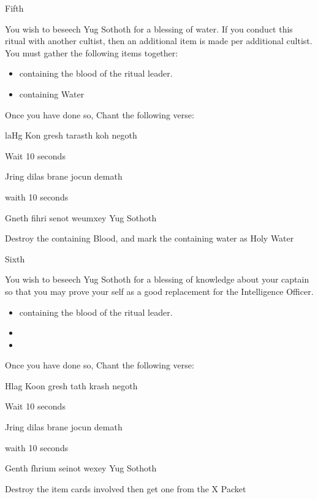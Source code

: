 \documentclass[greennotebook]{guildcamp4} %
\begin{document}
\begin{page}{Fifth}
	
		You wish to beseech Yug Sothoth for a blessing of water. If you conduct this ritual with another cultist, then an additional item is made per additional cultist. You must gather the following items together: 
		
		\begin{itemize}
			\item \iTestTube{} containing the blood of the ritual leader.
			\item \iTestTube{} containing Water
		\end{itemize}
		
		Once you have done so, Chant the following verse:
		
		laHg Kon gresh tarasth koh negoth
		
		Wait 10 seconds
		
		Jring dilas brane jocun demath
		
		waith 10 seconds
		
		Gneth fihri senot weumxey Yug Sothoth
		
		Destroy the \iTestTube{} containing Blood, and mark the \iTestTube{} containing water as Holy Water
		
	
\end{page}

\begin{page}{Sixth}
	

	You wish to beseech Yug Sothoth for a blessing of knowledge about your captain so that you may prove your self as a good replacement for the Intelligence Officer.  
		
	\begin{itemize}
			\item \iTestTube{} containing the blood of the ritual leader.
			\item \iGlassLens{}
			\item \iScrapMetal{}
	\end{itemize}
	
	Once you have done so, Chant the following verse:
		
	Hlag Koon gresh tath krash negoth
	
	Wait 10 seconds
	
	Jring dilas brane jocun demath
	
	waith 10 seconds
	
	Genth fhrium seinot wexey Yug Sothoth	
	
	Destroy the item cards involved then get one \iBlackMailD{} from the X Packet
	
	
\end{page}


\endnotebook
\end{document}
